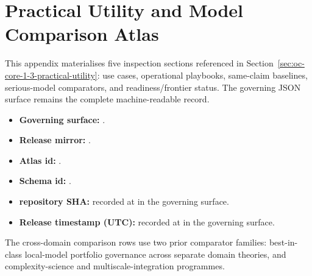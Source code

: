 \section{Practical Utility and Model Comparison Atlas}
\label{sec:oc-core-1-3-practical-utility-atlas}

This appendix materialises five inspection sections referenced in
Section~\ref{sec:oc-core-1-3-practical-utility}: use cases, operational
playbooks, same-claim baselines, serious-model comparators, and
readiness/frontier status. The governing JSON surface remains the complete
machine-readable record.

\begin{itemize}
\item \textbf{Governing surface:}
      .
\item \textbf{Release mirror:}
      .
\item \textbf{Atlas id:} .
\item \textbf{Schema id:} .
\item \textbf{repository SHA:} recorded at  in the governing surface.
\item \textbf{Release timestamp (UTC):} recorded at  in the governing surface.
\end{itemize}
The cross-domain comparison rows use two prior comparator families:
best-in-class local-model portfolio governance across separate domain
theories, and complexity-science and multiscale-integration programmes.

\begingroup
\footnotesize
\RaggedRight
\setlength{\emergencystretch}{1.2em}
\setlength{\tabcolsep}{2pt}
\setlength{\LTleft}{0pt}
\setlength{\LTright}{0pt}

\endgroup

